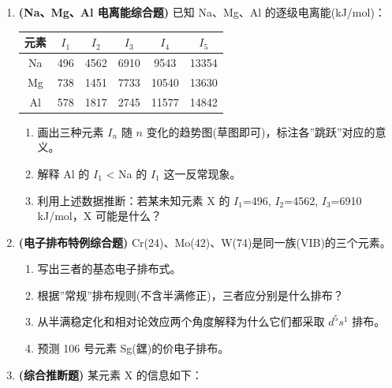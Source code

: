 \begin{enumerate}
  \begin{itemize}
  \tightlist
  \item
    \(\mathrm{Sc^{2+}}(3d^1) \to \mathrm{Sc^{3+}} + e^-\)，\(I = 24.75\) eV
  \item
    \(\mathrm{Sc^{2+}}(4s^1) \to \mathrm{Sc^{3+}} + e^-\)，\(I = 21.60\) eV
  \item
    \(\mathrm{Sc^+}(3d^1 4s^1) \to \mathrm{Sc} + e^-\)，\(E = -6.62\) eV
  \item
    \(\mathrm{Sc^+}(4s^2) \to \mathrm{Sc} + e^-\)，\(E = -7.98\) eV
  \item
    \(\mathrm{Sc}(3d^2 4s^1)\) 与 \(\mathrm{Sc}(3d^1 4s^2)\) 的能量差 \(\Delta E = 2.03\) eV
  \end{itemize}

  设轨道能 \(U_3\)(3d)、\(U_4\)(4s)；电子排斥参数 \(J_{dd}\)、\(J_{ds}\)、\(J_{ss}\)。利用 Koopmans 定理(\(I \approx -U\))列出方程组，解出五个参数，判断哪种排布能量最低。
\item
  \textbf{(Na、Mg、Al 电离能综合题)} 已知 Na、Mg、Al 的逐级电离能(kJ/mol)：

  {\def\LTcaptype{none} %
  \begin{longtable}[]{@{}cccccc@{}}
  \toprule\noalign{}
  元素 & \(I_1\) & \(I_2\) & \(I_3\) & \(I_4\) & \(I_5\) \\
  \midrule\noalign{}
  \endhead
  \bottomrule\noalign{}
  \endlastfoot
  Na & 496 & 4562 & 6910 & 9543 & 13354 \\
  Mg & 738 & 1451 & 7733 & 10540 & 13630 \\
  Al & 578 & 1817 & 2745 & 11577 & 14842 \\
  \end{longtable}
  }

  \begin{enumerate}
  \def\labelenumii{(\alph{enumii})}
  \tightlist
  \item
    画出三种元素 \(I_n\) 随 \(n\) 变化的趋势图(草图即可)，标注各''跳跃''对应的意义。
  \item
    解释 Al 的 \(I_1\) \textless{} Na 的 \(I_1\) 这一反常现象。
  \item
    利用上述数据推断：若某未知元素 X 的 \(I_1\)=496, \(I_2\)=4562, \(I_3\)=6910 kJ/mol，X 可能是什么？
  \end{enumerate}
\item
  \textbf{(电子排布特例综合题)} Cr(24)、Mo(42)、W(74)是同一族(VIB)的三个元素。

  \begin{enumerate}
  \def\labelenumii{(\alph{enumii})}
  \tightlist
  \item
    写出三者的基态电子排布式。
  \item
    根据''常规''排布规则(不含半满修正)，三者应分别是什么排布？
  \item
    从半满稳定化和相对论效应两个角度解释为什么它们都采取 \(d^5 s^1\) 排布。
  \item
    预测 106 号元素 Sg(𨭆)的价电子排布。
  \end{enumerate}
\item
  \textbf{(综合推断题)} 某元素 X 的信息如下：


\end{enumerate}
